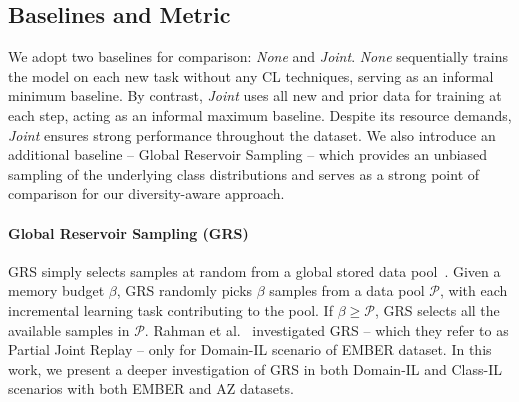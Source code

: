 



\subsection{Baselines and Metric}
\label{sec:baselines}

We adopt two baselines for comparison: {\em None} and {\em Joint}.  {\em None} sequentially trains the model on each new task without any CL techniques, serving as an informal minimum baseline. By contrast, {\em Joint} uses all new and prior data for training at each step, acting as an informal maximum baseline. Despite its resource demands, {\em Joint} ensures strong performance throughout the dataset. 
We also introduce an additional baseline -- Global Reservoir Sampling -- which provides an unbiased sampling of the underlying class distributions and serves as a strong point of comparison for our diversity-aware approach.

\paragraph*{Global Reservoir Sampling (GRS)}
\label{sec:grs}

GRS simply selects samples at random from a global stored data pool~\cite{vitter1985random,zhang2017deeper}. Given a memory budget $\beta$, GRS randomly picks $\beta$ samples from a data pool $\mathcal{P}$, with each incremental learning task contributing to the pool. 
If $\beta \geq \mathcal{P}$, GRS selects all the available samples in $\mathcal{P}$. 
Rahman et al.~\cite{continual-learning-malware} investigated GRS -- which they refer to as Partial Joint Replay -- only for Domain-IL scenario of EMBER dataset. In this work, we present a deeper investigation of GRS in both Domain-IL and Class-IL scenarios with both EMBER and AZ datasets. 

